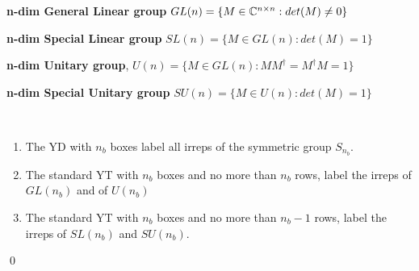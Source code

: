 {\bf n-dim General   Linear group} $GL(n)=\{ M\in{ \mathbb{C}}^{n\times n}:
det(M)\neq 0\}$

{\bf n-dim Special Linear group} $SL(n)=\{ M\in GL(n):
det(M)=1\}$

{\bf n-dim Unitary group}, $U(n)=\{ M\in GL(n):
M M^\dagger =M^\dagger M =1\}$

{\bf n-dim Special Unitary group}
$SU(n)=\{ M\in U(n):
det(M)=1\}$


\begin{claim}\
\begin{enumerate}
\item
The YD with $n_b$ boxes label all irreps of the symmetric group 
$S_{n_b}$.

\item
The standard YT with $n_b$ boxes and no more than $n_b$ rows,
label the irreps of $GL(n_b)$ and of $U(n_b)$
\item
The standard YT with $n_b$ boxes and
no more than $n_b-1$
rows, label the irreps of $SL(n_b)$ and $SU(n_b)$.
\end{enumerate}
\end{claim}
\proof
\qed


